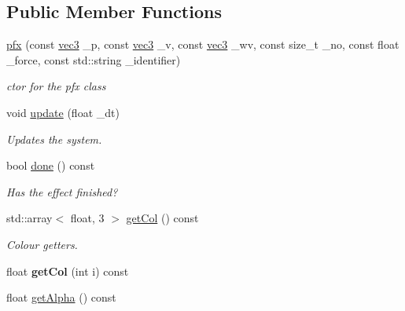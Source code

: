 \subsection*{Public Member Functions}
\begin{DoxyCompactItemize}
\item 
\hyperlink{classpfx_ac84c5ea0b457660ae81912e4c9eed7fa}{pfx} (const \hyperlink{structvec3}{vec3} \-\_\-p, const \hyperlink{structvec3}{vec3} \-\_\-v, const \hyperlink{structvec3}{vec3} \-\_\-wv, const size\-\_\-t \-\_\-no, const float \-\_\-force, const std\-::string \-\_\-identifier)
\begin{DoxyCompactList}\small\item\em ctor for the pfx class \end{DoxyCompactList}\item 
void \hyperlink{classpfx_ac004ec0e3f4862aef0eab62a8c116663}{update} (float \-\_\-dt)
\begin{DoxyCompactList}\small\item\em Updates the system. \end{DoxyCompactList}\item 
\hypertarget{classpfx_a16585641dad66de325de7614bf66363a}{bool \hyperlink{classpfx_a16585641dad66de325de7614bf66363a}{done} () const }\label{classpfx_a16585641dad66de325de7614bf66363a}

\begin{DoxyCompactList}\small\item\em Has the effect finished? \end{DoxyCompactList}\item 
\hypertarget{classpfx_a224a96eb769197e7f389c691566f16d0}{std\-::array$<$ float, 3 $>$ \hyperlink{classpfx_a224a96eb769197e7f389c691566f16d0}{get\-Col} () const }\label{classpfx_a224a96eb769197e7f389c691566f16d0}

\begin{DoxyCompactList}\small\item\em Colour getters. \end{DoxyCompactList}\item 
\hypertarget{classpfx_a6d2cc538e428a1a8f4a1c6b95f574620}{float {\bfseries get\-Col} (int i) const }\label{classpfx_a6d2cc538e428a1a8f4a1c6b95f574620}

\item 
\hypertarget{classpfx_ab18819f5c1a18f748fe5cc00dbdcca59}{float \hyperlink{classpfx_ab18819f5c1a18f748fe5cc00dbdcca59}{get\-Alpha} () const }\label{classpfx_ab18819f5c1a18f748fe5cc00dbdcca59}


\end{DoxyCompactItemize}
